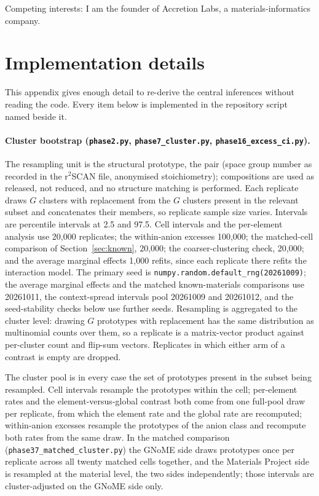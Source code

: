 \documentclass[11pt]{article}
\begin{document}
Competing interests: I am the founder of Accretion Labs, a materials-informatics company.

\appendix

\section{Implementation details}\label{app:impl}

This appendix gives enough detail to re-derive the central inferences without reading
the code. Every item below is implemented in the repository script named beside it.

\paragraph{Cluster bootstrap (\texttt{phase2.py}, \texttt{phase7\_cluster.py},
\texttt{phase16\_excess\_ci.py}).} The resampling unit is the structural prototype, the
pair (space group number as recorded in the r$^2$SCAN file, anonymised stoichiometry);
compositions are used as released, not reduced, and no structure matching is performed.
Each replicate draws $G$ clusters with replacement from the $G$ clusters present in the
relevant subset and concatenates their members, so replicate sample size varies.
Intervals are percentile intervals at 2.5 and 97.5. Cell intervals and the per-element
analysis use 20{,}000 replicates; the within-anion excesses 100{,}000; the matched-cell
comparison of Section~\ref{sec:known}, 20{,}000; the coarser-clustering check, 20{,}000;
and the average marginal effects 1{,}000 refits, since each replicate there refits the
interaction model. The primary seed is \texttt{numpy.random.default\_rng(20261009)}; the average
marginal effects and the matched known-materials comparisons use 20261011, the context-spread intervals pool 20261009 and 20261012,
and the seed-stability checks below use further seeds.
Resampling is aggregated to the cluster level: drawing $G$ prototypes with replacement
has the same distribution as multinomial counts over them, so a replicate is a
matrix-vector product against per-cluster count and flip-sum vectors. Replicates in
which either arm of a contrast is empty are dropped.

The cluster pool is in every case the set of prototypes present in the subset being
resampled. Cell intervals resample the prototypes within the cell; per-element rates and the
element-versus-global contrast both come from one full-pool draw per replicate, from which
the element rate and the global rate are recomputed; within-anion excesses resample the prototypes of the anion
class and recompute both rates from the same draw. In the matched comparison
(\texttt{phase37\_matched\_cluster.py}) the GNoME side draws prototypes once per
replicate across all twenty matched cells together, and the Materials Project side is
resampled at the material level, the two sides independently; those intervals are
cluster-adjusted on the GNoME side only.
\end{document}
